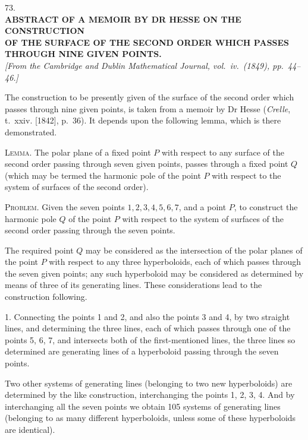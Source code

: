 \documentclass[10pt]{article}
\newcommand{\qedpage}{\vfill\pagebreak}
\begin{document}
\begin{center}
{\Large 73.}\\[2em]
{\large\bfseries ABSTRACT OF A MEMOIR BY DR HESSE ON THE CONSTRUCTION}\\
{\large\bfseries OF THE SURFACE OF THE SECOND ORDER WHICH PASSES}\\
{\large\bfseries THROUGH NINE GIVEN POINTS.}\\[1.5em]
\textit{[From the Cambridge and Dublin Mathematical Journal, vol.\ iv.\ (1849),
pp.~44--46.]}
\end{center}

The construction to be presently given of the surface of the second order which
passes through nine given points, is taken from a memoir by Dr Hesse
(\textit{Crelle}, t.~xxiv. [1842], p.~36). It depends upon the following lemma, which
is there demonstrated.

\textsc{Lemma.} The polar plane of a fixed point $P$ with respect to any surface of
the second order passing through seven given points, passes through a fixed point $Q$
(which may be termed the harmonic pole of the point $P$ with respect to the system
of surfaces of the second order).

\textsc{Problem.} Given the seven points $1,2,3,4,5,6,7$, and a point $P$, to
construct the harmonic pole $Q$ of the point $P$ with respect to the system of
surfaces of the second order passing through the seven points.

The required point $Q$ may be considered as the intersection of the polar planes of
the point $P$ with respect to any three hyperboloids, each of which passes through
the seven given points; any such hyperboloid may be considered as determined by
means of three of its generating lines. These considerations lead to the construction
following.

1. Connecting the points 1 and 2, and also the points 3 and 4, by two straight
lines, and determining the three lines, each of which passes through one of the points
5, 6, 7, and intersects both of the first-mentioned lines, the three lines so determined
are generating lines of a hyperboloid passing through the seven points.
\qedpage

Two other systems of generating lines (belonging to two new hyperboloids) are
determined by the like construction, interchanging the points 1, 2, 3, 4. And by
interchanging all the seven points we obtain 105 systems of generating lines
(belonging to as many different hyperboloids, unless some of these hyperboloids are
identical).
\end{document}
